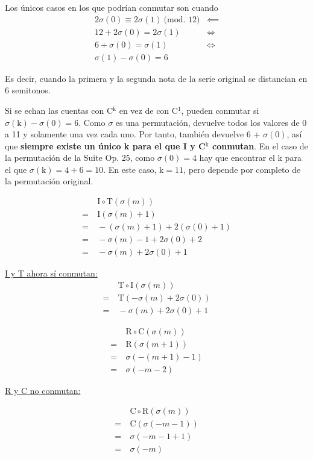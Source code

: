 		Los \'unicos casos en los que podr\'ian conmutar son cuando
		\begin{align*}
		2\sigma(0)\equiv2\sigma(1)\ \mbox{(mod. 12)}&\impliedby\\
		12+2\sigma(0)=2\sigma(1)&\Longleftrightarrow\\
		6+\sigma(0)=\sigma(1)&\Longleftrightarrow\\
		\sigma(1)-\sigma(0)=6&
		\end{align*}
		
		Es decir, cuando la primera y la segunda nota de la serie original se distancian en 6 semitonos.
		
		Si se echan las cuentas con C$^{\mbox{k}}$ en vez de con C$^1$, pueden conmutar si $\sigma(\mbox{k})-\sigma(0)=6$. Como $\sigma$ es una permutaci\'on, devuelve todos los valores de 0 a 11 y solamente una vez cada uno. Por tanto, tambi\'en devuelve 6 + $\sigma(0)$, as\'i que \textbf{siempre existe un \'unico k para el que I y C$^{\mbox{k}}$ conmutan}. En el caso de la permutaci\'on de la Suite Op. 25, como $\sigma(0)=4$ hay que encontrar el k para el que $\sigma(\mbox{k})=4+6=10$. En este caso, $\mbox{k}=11$, pero depende por completo de la permutaci\'on original.\\
		
		\begin{multicols}{3}
			\begin{align*}
			&\ \mbox{I}\circ\mbox{T}(\sigma(m))\\
			=&\ \mbox{I}(\sigma(m)+1)\\
			=&\ -(\sigma(m)+1) + 2(\sigma(0)+1)\\
			=&\ -\sigma(m)-1+2\sigma(0)+2\\
			=&\ -\sigma(m)+2\sigma(0)+1
			\end{align*}
			
			\underline{I y T ahora s\'i conmutan:}\\
			
			\begin{align*}
			&\ \mbox{T}\circ\mbox{I}(\sigma(m))\\
			=&\ \mbox{T}(-\sigma(m)+2\sigma(0))\\
			=&\ -\sigma(m)+2\sigma(0)+1
			\end{align*}
		\end{multicols}
		
		\begin{multicols}{3}
		\begin{align*}
		&\ \mbox{R}\circ\mbox{C}(\sigma(m))\\
		=&\ \mbox{R}(\sigma(m+1))\\
		=&\ \sigma(-(m+1)-1)\\
		=&\ \sigma(-m-2)
		\end{align*}
		
		\underline{R y C no conmutan:}
		
		\begin{align*}
		&\ \mbox{C}\circ\mbox{R}(\sigma(m))\\
		=&\ \mbox{C}(\sigma(-m-1))\\
		=&\ \sigma(-m-1+1)\\
		=&\ \sigma(-m)
		\end{align*}
		\end{multicols}
		
